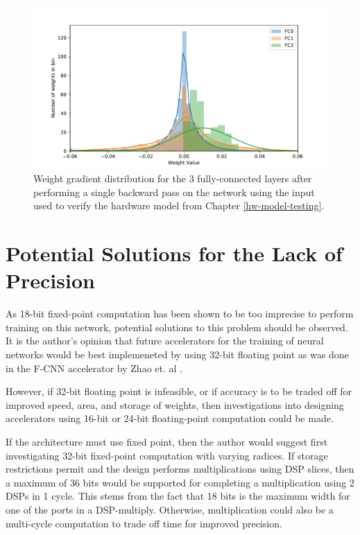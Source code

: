 \begin{figure}
	\centering 
	\includegraphics[width=\textwidth]{figures/weight_distrib}
	\caption{Weight gradient distribution for the 3 fully-connected layers after performing a single backward pass on the network using the input used to verify the hardware model from Chapter \ref{hw-model-testing}.}
	\label{weight-distrib}
\end{figure}

\section{Potential Solutions for the Lack of Precision}
As 18-bit fixed-point computation has been shown to be too imprecise to perform training on this network, potential solutions to this problem should be observed. It is the author's opinion that future accelerators for the training of neural networks would be best implemeneted by using 32-bit floating point as was done in the F-CNN accelerator by Zhao et. al \cite{FCNN}. 

However, if 32-bit floating point is infeasible, or if accuracy is to be traded off for improved speed, area, and storage of weights, then investigations into designing accelerators using 16-bit or 24-bit floating-point computation could be made.

If the architecture must use fixed point, then the author would suggest first investigating 32-bit fixed-point computation with varying radices. If storage restrictions permit and the design performs multiplications using DSP slices, then a maximum of 36 bits would be supported for completing a multiplication using 2 DSPs in 1 cycle. This stems from the fact that 18 bits is the maximum width for one of the ports in a DSP-multiply. Otherwise, multiplication could also be a multi-cycle computation to trade off time for improved precision.

